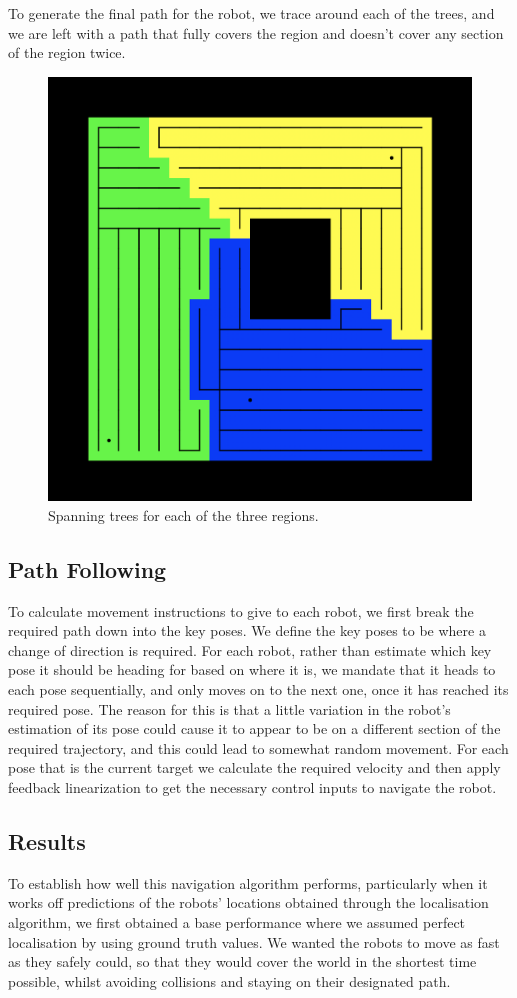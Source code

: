 \documentclass[a4paper, 10pt, conference]{ieeeconf}      %
\begin{document}
To generate the final path for the robot, we trace around each of the trees, and we are left with a path that fully covers the region and doesn't cover any section of the region twice.

\begin{figure}
	\centering
	\includegraphics[width=0.8\columnwidth]{figure_mst.png}
	\caption{Spanning trees for each of the three regions.}
	\label{fig:mst}
\end{figure}

\subsection{Path Following}
To calculate movement instructions to give to each robot, we first break the required path down into the key poses. We define the key poses to be where a change of direction is required. For each robot, rather than estimate which key pose it should be heading for based on where it is, we mandate that it heads to each pose sequentially, and only moves on to the next one, once it has reached its required pose. The reason for this is that a little variation in the robot's estimation of its pose could cause it to appear to be on a different section of the required trajectory, and this could lead to somewhat random movement. For each pose that is the current target we calculate the required velocity and then apply feedback linearization to get the necessary control inputs to navigate the robot.



\subsection{Results}
To establish how well this navigation algorithm performs, particularly when it works off predictions of the robots' locations obtained through the localisation algorithm, we first obtained a base performance where we assumed perfect localisation by using ground truth values. We wanted the robots to move as fast as they safely could, so that they would cover the world in the shortest time possible, whilst avoiding collisions and staying on their designated path.
\end{document}
